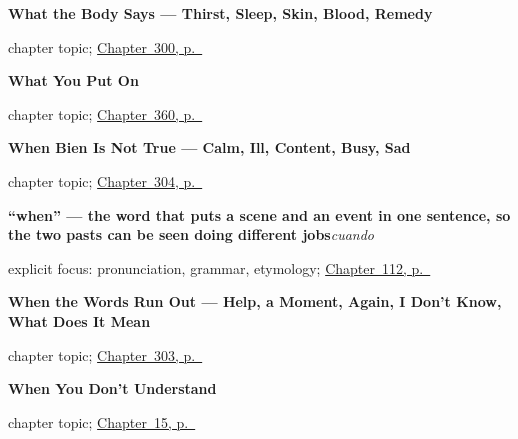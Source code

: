 \noindent\begin{minipage}[t]{\linewidth}
\raggedright
\textbf{What the Body Says --- Thirst, Sleep, Skin, Blood, Remedy}\par
\footnotesize chapter topic; \hyperref[ch:el-cuerpo-dice]{Chapter~300, p.~\pageref*{ch:el-cuerpo-dice}}
\end{minipage}\par\smallskip

\noindent\begin{minipage}[t]{\linewidth}
\raggedright
\textbf{What You Put On}\par
\footnotesize chapter topic; \hyperref[ch:la-ropa-y-el-zapato]{Chapter~360, p.~\pageref*{ch:la-ropa-y-el-zapato}}
\end{minipage}\par\smallskip

\noindent\begin{minipage}[t]{\linewidth}
\raggedright
\textbf{When Bien Is Not True --- Calm, Ill, Content, Busy, Sad}\par
\footnotesize chapter topic; \hyperref[ch:como-estoy]{Chapter~304, p.~\pageref*{ch:como-estoy}}
\end{minipage}\par\smallskip

\noindent\begin{minipage}[t]{\linewidth}
\raggedright
\textbf{\textquotedblleft{}when\textquotedblright{} — the word that puts a scene and an event in one sentence, so the two pasts can be seen doing different jobs}\enspace\emph{cuando}\par
\footnotesize explicit focus: pronunciation, grammar, etymology; \hyperref[ch:cuando]{Chapter~112, p.~\pageref*{ch:cuando}}
\end{minipage}\par\smallskip

\noindent\begin{minipage}[t]{\linewidth}
\raggedright
\textbf{When the Words Run Out --- Help, a Moment, Again, I Don't Know, What Does It Mean}\par
\footnotesize chapter topic; \hyperref[ch:reparaciones]{Chapter~303, p.~\pageref*{ch:reparaciones}}
\end{minipage}\par\smallskip

\noindent\begin{minipage}[t]{\linewidth}
\raggedright
\textbf{When You Don't Understand}\par
\footnotesize chapter topic; \hyperref[ch:repair]{Chapter~15, p.~\pageref*{ch:repair}}
\end{minipage}\par\smallskip


